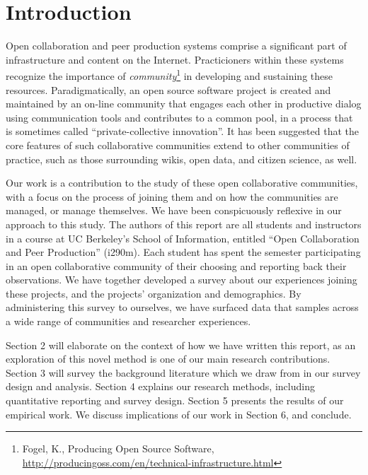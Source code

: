 \section{Introduction}

Open collaboration and peer production systems comprise a significant
part of infrastructure and content on the Internet.
Practicioners within these systems recognize the importance of
\emph{community}\footnote{Fogel, K., Producing Open Source Software, \url{http://producingoss.com/en/technical-infrastructure.html}} in developing and sustaining these resources.
Paradigmatically, an open source software project is created and maintained by an on-line community that engages each other in productive dialog using communication tools and contributes to
a common pool\cite{ostrom1990}, in a process that is sometimes called ``private-collective innovation''.\cite{vonhippel2003oss}
It has been suggested that the core features of such collaborative
communities extend to other communities of practice, such as those
surrounding wikis, open data, and citizen science, as well.

Our work is a contribution to the study of these open collaborative
communities, with a focus on the process of joining them and on how
the communities are managed, or manage themselves.
We have been conspicuously reflexive in our approach to this study.
The authors of this report are all students and instructors in a
course at UC Berkeley's School of Information, entitled ``Open Collaboration and Peer Production'' (i290m).
Each student has spent the semester participating in an open
collaborative community of their choosing and reporting back
their observations. We have together developed a survey about our experiences joining
these projects, and the projects' organization and demographics.
By administering this survey to ourselves, we have surfaced data
that samples across a wide range of communities and researcher experiences.

Section 2 will elaborate on the context of how we have written this report, as an exploration of this novel method is one of our main research contributions.
Section 3 will survey the background literature which we draw from in
our survey design and analysis.
Section 4 explains our research methods, including quantitative
reporting and survey design.
Section 5 presents the results of our empirical work.
We discuss implications of our work in Section 6, and conclude. 


